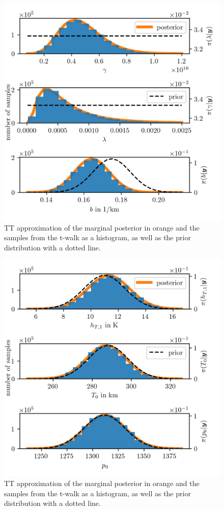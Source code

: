 \begin{figure}[ht!]
	\centering
	\includegraphics{PHdPTPost0.png}
	\caption[Histograms and TT approximation of posterior distribution as well as hyper-prior distribution.]{TT approximation of the marginal posterior in orange and the samples from the t-walk as a histogram, as well as the prior distribution with a dotted line.}
	\label{fig:PostHistTT0}
\end{figure}
\begin{figure}[ht!]
	\centering
	\includegraphics{PHdPTPost1.png}
	\caption[Histograms and TT approximation of posterior distribution as well as hyper-prior distribution.]{TT approximation of the marginal posterior in orange and the samples from the t-walk as a histogram, as well as the prior distribution with a dotted line.}
	\label{fig:PostHistTT1}
\end{figure}
